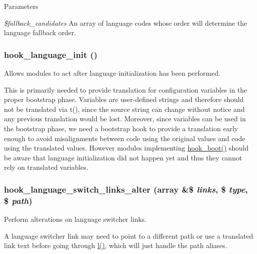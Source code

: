 \begin{DoxyParams}{Parameters}
\item[{\em \$fallback\_\-candidates}]An array of language codes whose order will determine the language fallback order. \end{DoxyParams}
\hypertarget{group__hooks_ga6db3413f657addb6ebb32ac7d2561076}{
\subsubsection[{hook\_\-language\_\-init}]{\setlength{\rightskip}{0pt plus 5cm}hook\_\-language\_\-init ()}}
\label{group__hooks_ga6db3413f657addb6ebb32ac7d2561076}
Allows modules to act after language initialization has been performed.

This is primarily needed to provide translation for configuration variables in the proper bootstrap phase. Variables are user-\/defined strings and therefore should not be translated via t(), since the source string can change without notice and any previous translation would be lost. Moreover, since variables can be used in the bootstrap phase, we need a bootstrap hook to provide a translation early enough to avoid misalignments between code using the original values and code using the translated values. However modules implementing \hyperlink{group__hooks_ga9ac1dfffdc69471a3d00d67503c71577}{hook\_\-boot()} should be aware that language initialization did not happen yet and thus they cannot rely on translated variables. \hypertarget{group__hooks_ga77186f4d805f77a8edc3bd8dd6041339}{
\subsubsection[{hook\_\-language\_\-switch\_\-links\_\-alter}]{\setlength{\rightskip}{0pt plus 5cm}hook\_\-language\_\-switch\_\-links\_\-alter (array \&\$ {\em links}, \/  \$ {\em type}, \/  \$ {\em path})}}
\label{group__hooks_ga77186f4d805f77a8edc3bd8dd6041339}
Perform alterations on language switcher links.

A language switcher link may need to point to a different path or use a translated link text before going through \hyperlink{common_8inc_ad3b36c06dc46250b8d22b8d0d2e7bd97}{l()}, which will just handle the path aliases.


